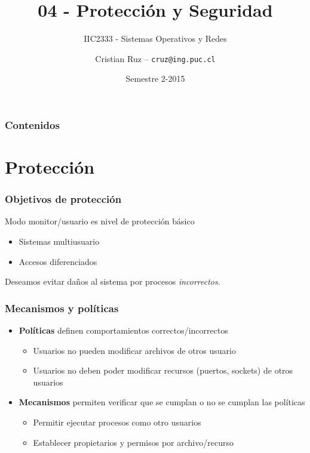 \documentclass[letter]{beamer}
\title[IIC2333] %
{04 - Protección y Seguridad}
\subtitle{IIC2333 - Sistemas Operativos y Redes}
\author[C.Ruz] %
{Cristian Ruz -- {\tt cruz@ing.puc.cl} }
\institute[PUC] %
{
  Departamento de Ciencia de la Computación\\
  Pontificia Universidad Católica de Chile
}
\date[2/2015] %
{Semestre 2-2015}
\begin{document}
\frame{\titlepage}

\begin{frame}
\frametitle{Contenidos}
\tableofcontents
\end{frame}


\section{Protección}

\begin{frame}
  \frametitle{Objetivos de protección}
  
  Modo monitor/usuario es nivel de protección básico
  
  \begin{itemize}
    \item Sistemas multiusuario
    \item Accesos diferenciados
  \end{itemize}

  Deseamos evitar daños al sistema por procesos {\em incorrectos}.
  
\end{frame}
\begin{frame}
  \frametitle{Mecanismos y políticas}
  
  \begin{itemize}
    \item {\bf Políticas} definen comportamientos correctos/incorrectos
      \begin{itemize}
        \item Usuarios no pueden modificar archivos de otros usuario
        \item Usuarios no deben poder modificar recursos (puertos, sockets)
              de otros usuarios
      \end{itemize}
    \item {\bf Mecanismos} permiten verificar que se cumplan o no se cumplan
          las políticas
      \begin{itemize}
        \item Permitir ejecutar procesos como otro usuarios
        \item Establecer propietarios y permisos por archivo/recurso
      \end{itemize}
  \end{itemize}
  
\end{frame}
\end{document}
